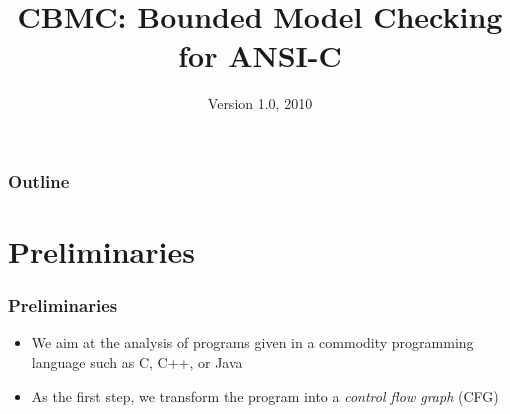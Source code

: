 

\title{CBMC: Bounded Model Checking for ANSI-C}

\date{Version 1.0, 2010}

\def\TEMPOP#1{\mathrm{\bf #1}}
\def\X{\TEMPOP{X}}
\def\F{\TEMPOP{F}}
\def\E{\TEMPOP{E}}
\def\A{\TEMPOP{A}}
\def\G{\TEMPOP{G}}
\def\U{\mathrel{\TEMPOP{U}}}
\def\R{\mathrel{\TEMPOP{R}}}




\frame[plain]{\titlepage}


\begin{frame}
\frametitle{Outline}
\setcounter{tocdepth}{1}
\tableofcontents
\setcounter{tocdepth}{2}
\end{frame}


\section{Preliminaries}

\begin{frame}
\frametitle{Preliminaries}

\begin{itemize}

\item We aim at the analysis of programs given in a
commodity programming language such as C, C++, or Java
\vfill

\item As the first step, we transform the program
into a \emph{control flow graph} (CFG)

\end{itemize}

\vfill

\begin{center}
\scalebox{.75}{}
\end{center}

\end{frame}

